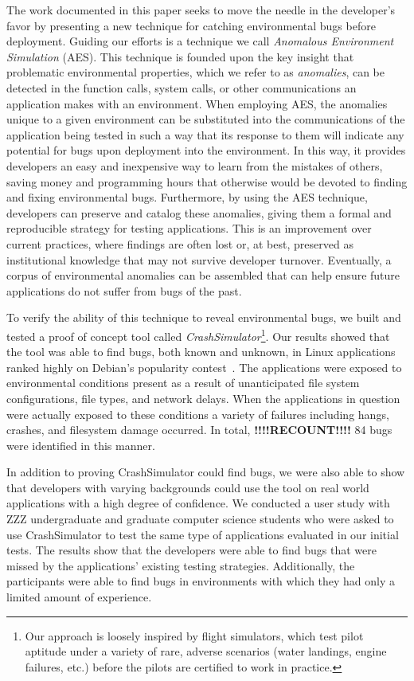 The work documented in this paper
seeks to move the needle in the developer's favor
by presenting a new technique for catching environmental bugs
before deployment.
Guiding our efforts
is a technique
we call \textit{Anomalous Environment Simulation} (AES).
This technique is founded upon the key insight
that problematic environmental properties,
which we refer to as \textit{anomalies},
can be detected
in the function calls,
system calls,
or other communications an application makes with an environment.
When employing AES,
the anomalies
unique to a given environment
can be substituted into
the communications of the application being tested
in such a way
that its response to them will indicate any potential
for bugs upon deployment
into the environment.
In this way, it provides developers
an easy and inexpensive way
to learn from the mistakes of others,
saving money and programming hours
that otherwise would be devoted to finding and fixing
environmental bugs.
Furthermore,
by using the AES technique,
developers can preserve and catalog
these anomalies,
giving them a formal and reproducible strategy for testing applications.
This is an improvement over current practices,
where findings are often lost or,
at best, preserved as
institutional knowledge
that may not survive developer turnover.
Eventually,
a corpus of environmental anomalies can be assembled
that can help ensure
future applications do not suffer from bugs of the past.

To verify the ability of this technique to reveal environmental
bugs, we built and tested a proof of concept tool
called {\em CrashSimulator}\footnote{Our approach is
loosely inspired by flight simulators, which test pilot aptitude under a
variety of rare, adverse scenarios (water landings, engine failures, etc.)
before the pilots are certified to work in practice.}.
Our results showed that the tool was able to find bugs,
both known and unknown,
in Linux applications ranked highly on Debian's popularity
contest~\cite{DebPopCon}.  The applications were exposed to
environmental conditions present as a result of unanticipated
file system configurations, file types, and network delays.
When the applications in
question were actually exposed to these conditions a variety of failures
including hangs, crashes, and filesystem damage occurred.  In total,
\textbf{!!!!RECOUNT!!!!} 84
bugs were identified in this manner.

In addition to proving CrashSimulator could find bugs, we were also able to
show that developers with varying backgrounds
could use the tool
on real world applications
with a high degree of confidence.
We conducted a user study with
ZZZ undergraduate and graduate computer science students
who were asked to use CrashSimulator to test
the same type of applications evaluated in our initial tests.
The results show that the developers were able to find bugs
that were missed by the applications' existing testing strategies.
Additionally, the
participants were able to find bugs
in environments with which they had only a limited amount of experience.

